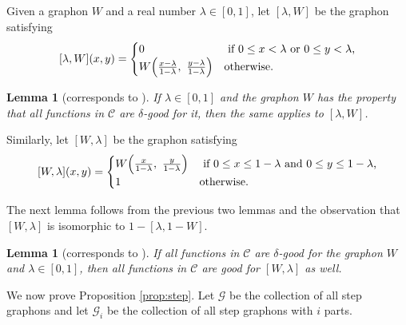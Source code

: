 \documentclass[11pt]{article}
\let\originalleft\left
\let\originalright\right
\renewcommand{\left}{\mathopen{}\mathclose\bgroup\originalleft}
\renewcommand{\right}{\aftergroup\egroup\originalright}
\newtheorem{lem}[thm]{Lemma}
\theoremstyle{definition}
\newcommand{\paren}[1]{\left( #1 \right)}
\newcommand{\C}{\mathscr{C}}
\begin{document}
Given a graphon $W$ and a real number $\lambda \in [0,1]$, let $[\lambda, W]$ be the graphon satisfying \[ [\lambda, W] (x,y) = \begin{cases}
    0 & \text{ if $0 \le x < \lambda$ or $0 \le y < \lambda$,} \\
    W \paren{\frac{x - \lambda}{1 - \lambda}, ~ \frac{y - \lambda}{1 - \lambda}} & \text{otherwise}.
\end{cases} \]

\begin{lem}[corresponds to {\cite[Lemma 3.5]{RW}}]\label{lem:lambdaW}
    If $\lambda \in [0,1]$ and the graphon $W$ has the property that all functions in $\C$ are $\delta$-good for it, then the same applies to $[\lambda, W]$.
\end{lem}

Similarly, let $[W, \lambda]$ be the graphon satisfying \[ [W, \lambda] (x,y) = \begin{cases}
    W \paren{\frac{x}{1 - \lambda}, ~ \frac{y}{1 - \lambda}} & \text{ if $0 \le x \le 1 - \lambda$ and $0 \le y \le 1 - \lambda$,} \\
    1 & \text{otherwise}.
\end{cases} \]

The next lemma follows from the previous two lemmas and the observation that $[W, \lambda]$ is isomorphic to $1-[\lambda, 1-W]$.

\begin{lem}[corresponds to {\cite[Lemma 3.6]{RW}}]\label{lem:Wlambda}
    If all functions in $\C$ are $\delta$-good for the graphon $W$ and $\lambda \in [0, 1]$, then all functions in $\C$ are good for $[W, \lambda]$ as well.
\end{lem}

We now prove Proposition \ref{prop:step}.
Let $\mathcal G$ be the collection of all step graphons and let $\mathcal G_i$ be the collection of all step graphons with $i$ parts.
\end{document}
